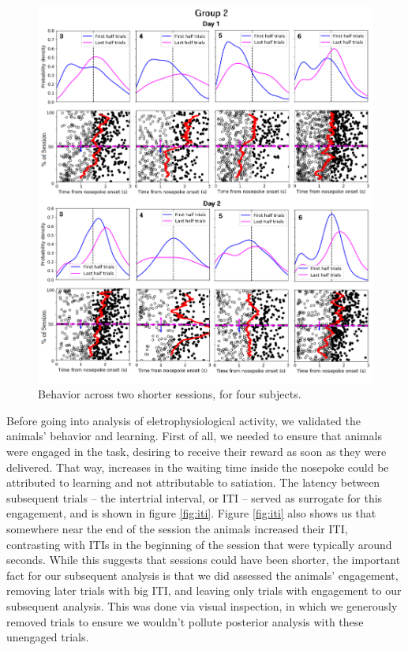 \begin{figure}
    \centering
    \includegraphics[width=\textwidth]{figures/grupo2.png}
    \caption[Behavior across two sessions]{Behavior across two shorter sessions, for four subjects.}
    \label{fig:behavior2}
\end{figure} %
Before going into analysis of eletrophysiological activity, we validated the animals' behavior and learning. First of all, we needed to ensure that animals were engaged in the task, desiring to receive their reward as soon as they were delivered. That way, increases in the waiting time inside the nosepoke could be attributed to learning and not attributable to satiation. The latency between subsequent trials -- the intertrial interval, or ITI --  served as surrogate for this engagement, and is shown in figure \ref{fig:iti}. 
Figure \ref{fig:iti} also shows us that somewhere near the end of the session the animals increased their ITI, contrasting with ITIs in the beginning of the session that were typically around seconds. While this suggests that sessions could have been shorter, the important fact for our subsequent analysis is that we did assessed the animals' engagement, removing later trials with big ITI, and leaving only trials with engagement to our subsequent analysis. This was done via visual inspection, in which we generously removed trials to ensure we wouldn't pollute posterior analysis with these unengaged trials.

